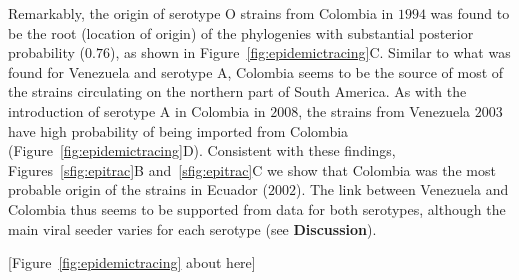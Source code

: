 \documentclass[10pt]{article}
\begin{document}
Remarkably, the origin of serotype O strains from Colombia in $1994$ was found to be the root (location of origin) of the phylogenies with substantial posterior probability ($0.76$), as shown in Figure~\ref{fig:epidemictracing}C.
Similar to what was found for Venezuela and serotype A, Colombia seems to be the source of most of the strains circulating on the northern part of South America.
As with the introduction of serotype A in Colombia in $2008$, the strains from Venezuela $2003$ have high probability of being imported from Colombia (Figure~\ref{fig:epidemictracing}D).
Consistent with these findings, Figures~\ref{sfig:epitrac}B and~\ref{sfig:epitrac}C we show that Colombia was the most probable origin of the strains in Ecuador ($2002$).
The link between Venezuela and Colombia thus seems to be supported from data for both serotypes, although the main viral seeder varies for each serotype (see \textbf{Discussion}).

\begin{center}
 [Figure~\ref{fig:epidemictracing} about here]
\end{center}
\end{document}
